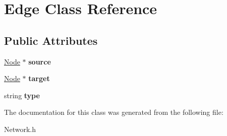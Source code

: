 \hypertarget{classEdge}{\section{\-Edge \-Class \-Reference}
\label{classEdge}
}
\subsection*{\-Public \-Attributes}
\begin{DoxyCompactItemize}
\item 
\hypertarget{classEdge_a79aa2bf58656c7cec77ac1b2a31940a5}{\hyperlink{classNode}{\-Node} $\ast$ {\bfseries source}}\label{classEdge_a79aa2bf58656c7cec77ac1b2a31940a5}

\item 
\hypertarget{classEdge_a2772ec48091c855edc820d4191f32479}{\hyperlink{classNode}{\-Node} $\ast$ {\bfseries target}}\label{classEdge_a2772ec48091c855edc820d4191f32479}

\item 
\hypertarget{classEdge_a248d7f545596fea799d86d8b7a57dc66}{string {\bfseries type}}\label{classEdge_a248d7f545596fea799d86d8b7a57dc66}

\end{DoxyCompactItemize}


\-The documentation for this class was generated from the following file\-:\begin{DoxyCompactItemize}
\item 
\-Network.\-h\end{DoxyCompactItemize}
